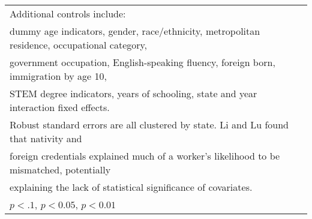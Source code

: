 \begin{table}[htbp]
\begin{tabular}{l*{4}{c}}
\bottomrule
\multicolumn{5}{l}{\footnotesize Additional controls include:}\\
\multicolumn{5}{l}{\footnotesize dummy age indicators, gender, race/ethnicity, metropolitan residence, occupational category,}\\
\multicolumn{5}{l}{\footnotesize government occupation, English-speaking fluency, foreign born, immigration by age 10,}\\
\multicolumn{5}{l}{\footnotesize STEM degree indicators, years of schooling, state and year interaction fixed effects.}\\
\multicolumn{5}{l}{\footnotesize Robust standard errors are all clustered by state. Li and Lu found that nativity and}\\
\multicolumn{5}{l}{\footnotesize foreign credentials explained much of a worker's likelihood to be mismatched, potentially}\\
\multicolumn{5}{l}{\footnotesize explaining the lack of statistical significance of covariates.}\\
\multicolumn{5}{l}{\footnotesize \sym{*} \(p<.1\), \sym{**} \(p<0.05\), \sym{***} \(p<0.01\)}\\
\end{tabular}
\end{table}
